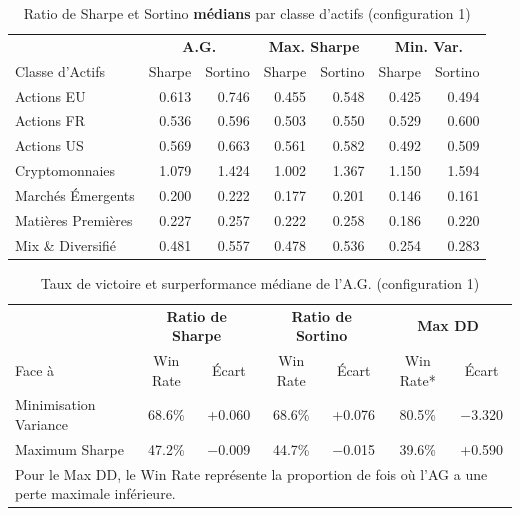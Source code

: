 \begin{table}[H]
\centering
\caption{Ratio de Sharpe et Sortino \textbf{médians} par classe d'actifs (configuration 1)\label{tab:asset_conf1}}
\footnotesize
\begin{tabular}{l|rr|rr|rr}
\toprule
& \multicolumn{2}{c|}{\textbf{A.G.}} & \multicolumn{2}{c|}{\textbf{Max. Sharpe}} & \multicolumn{2}{c}{\textbf{Min. Var.}} \\
Classe d'Actifs & Sharpe & Sortino & Sharpe & Sortino & Sharpe & Sortino \\
\midrule
Actions EU & 0.613 & 0.746 & 0.455 & 0.548 & 0.425 & 0.494 \\
Actions FR & 0.536 & 0.596 & 0.503 & 0.550 & 0.529 & 0.600 \\
Actions US & 0.569 & 0.663 & 0.561 & 0.582 & 0.492 & 0.509 \\
Cryptomonnaies & 1.079 & 1.424 & 1.002 & 1.367 & 1.150 & 1.594 \\
Marchés Émergents & 0.200 & 0.222 & 0.177 & 0.201 & 0.146 & 0.161 \\
Matières Premières & 0.227 & 0.257 & 0.222 & 0.258 & 0.186 & 0.220 \\
Mix \& Diversifié & 0.481 & 0.557 & 0.478 & 0.536 & 0.254 & 0.283 \\
\bottomrule
\end{tabular}
\end{table}

\begin{table}[H]
\centering
\caption{Taux de victoire et surperformance médiane de l'A.G. (configuration 1)\label{tab:win_conf1}}
\footnotesize
\begin{tabular}{lcc|cc|cc}
\toprule
 & \multicolumn{2}{c|}{\textbf{Ratio de Sharpe}} & \multicolumn{2}{c|}{\textbf{Ratio de Sortino}} & \multicolumn{2}{c}{\textbf{Max DD}} \\
Face à & Win Rate & Écart & Win Rate & Écart & Win Rate* & Écart \\
\midrule
Minimisation Variance & 68.6\% & +0.060 & 68.6\% & +0.076 & 80.5\% & $-$3.320 \\
Maximum Sharpe & 47.2\% & $-$0.009 & 44.7\% & $-$0.015 & 39.6\% & +0.590 \\
\bottomrule
\multicolumn{7}{l}{\scriptsize *Pour le Max DD, le Win Rate représente la proportion de fois où l'AG a une perte maximale inférieure.} \\
\end{tabular}
\end{table}

